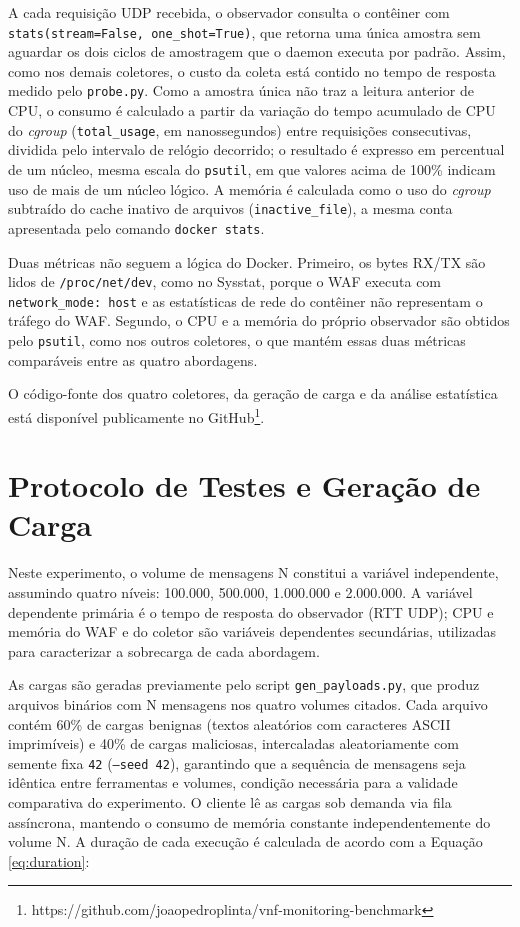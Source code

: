 A cada requisição UDP recebida, o observador consulta o contêiner com \texttt{stats(stream=False, one\_shot=True)}, que retorna uma única amostra sem aguardar os dois ciclos de amostragem que o daemon executa por padrão. Assim, como nos demais coletores, o custo da coleta está contido no tempo de resposta medido pelo \texttt{probe.py}. Como a amostra única não traz a leitura anterior de CPU, o consumo é calculado a partir da variação do tempo acumulado de CPU do \textit{cgroup} (\texttt{total\_usage}, em nanossegundos) entre requisições consecutivas, dividida pelo intervalo de relógio decorrido; o resultado é expresso em percentual de um núcleo, mesma escala do \texttt{psutil}, em que valores acima de 100\% indicam uso de mais de um núcleo lógico. A memória é calculada como o uso do \textit{cgroup} subtraído do cache inativo de arquivos (\texttt{inactive\_file}), a mesma conta apresentada pelo comando \texttt{docker stats}.

Duas métricas não seguem a lógica do Docker. Primeiro, os bytes RX/TX são lidos de \texttt{/proc/net/dev}, como no Sysstat, porque o WAF executa com \texttt{network\_mode: host} e as estatísticas de rede do contêiner não representam o tráfego do WAF. Segundo, o CPU e a memória do próprio observador são obtidos pelo \texttt{psutil}, como nos outros coletores, o que mantém essas duas métricas comparáveis entre as quatro abordagens.

O código-fonte dos quatro coletores, da geração de carga e da análise estatística está disponível publicamente no GitHub\footnote{https://github.com/joaopedroplinta/vnf-monitoring-benchmark}.

\section{Protocolo de Testes e Geração de Carga}

Neste experimento, o volume de mensagens N constitui a variável independente, assumindo quatro níveis: 100.000, 500.000, 1.000.000 e 2.000.000. A variável dependente primária é o tempo de resposta do observador (RTT UDP); CPU e memória do WAF e do coletor são variáveis dependentes secundárias, utilizadas para caracterizar a sobrecarga de cada abordagem.

As cargas são geradas previamente pelo script \texttt{gen\_payloads.py}, que produz arquivos binários com N mensagens nos quatro volumes citados. Cada arquivo contém 60\% de cargas benignas (textos aleatórios com caracteres ASCII imprimíveis) e 40\% de cargas maliciosas, intercaladas aleatoriamente com semente fixa \texttt{42} (\texttt{--seed 42}), garantindo que a sequência de mensagens seja idêntica entre ferramentas e volumes, condição necessária para a validade comparativa do experimento. O cliente lê as cargas sob demanda via fila assíncrona, mantendo o consumo de memória constante independentemente do volume N. A duração de cada execução é calculada de acordo com a Equação \ref{eq:duration}:

